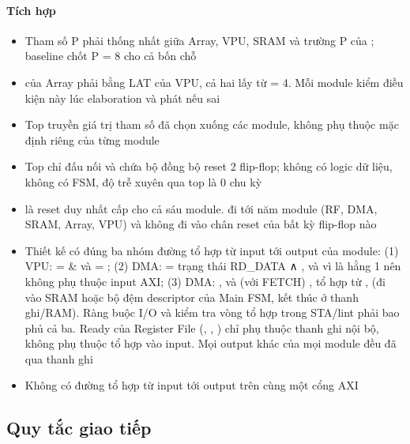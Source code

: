 \paragraph{Tích hợp}\label{par:6-2}
\begin{itemize}
\item Tham số P phải thống nhất giữa Array, VPU, SRAM và trường P của ; baseline chốt P = 8 cho cả bốn chỗ
\item {} của Array phải bằng LAT của VPU, cả hai lấy từ  = 4. Mỗi module kiểm điều kiện này lúc elaboration và phát  nếu sai
\item Top truyền giá trị tham số đã chọn xuống các module, không phụ thuộc mặc định riêng của từng module
\item Top chỉ đấu nối và chứa bộ đồng bộ reset 2 flip-flop; không có logic dữ liệu, không có FSM, độ trễ xuyên qua top là 0 chu kỳ
\item {} là reset duy nhất cấp cho cả sáu module.  đi tới năm module (RF, DMA, SRAM, Array, VPU) và không đi vào chân reset của bất kỳ flip-flop nào
\item Thiết kế có đúng ba nhóm đường tổ hợp từ input tới output của module: (1) VPU:  =  \&  và  = ; (2) DMA:  = trạng thái RD\_DATA ∧ , và vì  là hằng 1 nên  không phụ thuộc input AXI; (3) DMA: ,  và (với FETCH) ,  tổ hợp từ ,  (đi vào SRAM hoặc bộ đệm descriptor của Main FSM, kết thúc ở thanh ghi/RAM). Ràng buộc I/O và kiểm tra vòng tổ hợp trong STA/lint phải bao phủ cả ba. Ready của Register File (, , ) chỉ phụ thuộc thanh ghi nội bộ, không phụ thuộc tổ hợp vào input. Mọi output khác của mọi module đều đã qua thanh ghi
\item Không có đường tổ hợp từ input tới output trên cùng một cổng AXI
\end{itemize}

\subsection{Quy tắc giao tiếp}\label{sec:6.3}

